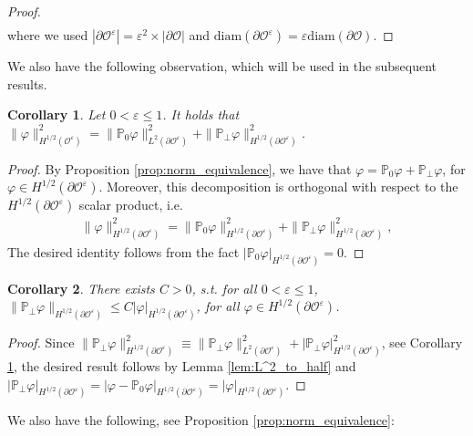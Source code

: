 \documentclass[]{article}
\newtheorem{corollary}{Corollary}
\numberwithin{equation}{section}
\numberwithin{theorem}{section}
\numberwithin{lemma}{section}
\numberwithin{corollary}{section}
\numberwithin{proposition}{section}
\numberwithin{definition}{section}
\newcommand{\re}{\varepsilon}
\renewcommand{\O}{\mathcal{O}}
\newcommand{\bO}{\partial\O}
\begin{document}
\begin{appendices}
\begin{proof}
\begin{align*}
			\end{align*}
			where we used $|\partial\mathcal{O}^{\re}| = \re^2 \times |\partial\mathcal{O}|$ and $\text{diam}(\partial \mathcal{O}^{\re}) = \re  \text{diam}(\partial \mathcal{O})$.
		\end{proof}
		We also have the following observation, which will be used in the subsequent results.
		\begin{corollary}
			\label{corollary:split_norm_H_half}
			Let $0<\re\leq 1$. It holds that  $\|\varphi\|^2_{H^{1/2}(\O^{\re})}=\|\mathbb{P}_0\varphi\|^2_{L^2(\partial\mathcal{O}^{\re})}+\|\mathbb{P}_{\perp}\varphi\|^2_{H^{1/2}(\partial\mathcal{O}^{\re})}$. 
		\end{corollary}
		\begin{proof}
			By Proposition \ref{prop:norm_equivalence}, we have that $\varphi=\mathbb{P}_0\varphi+\mathbb{P}_{\perp}\varphi$, for $\varphi \in H^{1/2}(\bO^{\re})$. Moreover, this decomposition is orthogonal with respect to the $H^{1/2}(\partial\mathcal{O}^{\re})$ scalar product, i.e.
			\begin{align*}
				\|\varphi\|^2_{H^{1/2}(\partial\mathcal{O}^{\re})}=\| \mathbb{P}_0\varphi\|^2_{H^{1/2}(\partial\mathcal{O}^{\re})}+\|\mathbb{P}_{\perp}\varphi\|^2_{H^{1/2}(\partial\mathcal{O}^{\re})},
			\end{align*} 
			The desired identity follows from the fact $|\mathbb{P}_0\varphi|_{H^{1/2}(\bO^{\re})} = 0$.
		\end{proof}
		\begin{corollary}
			\label{cor:equiv_norm}
			There exists $C>0$, s.t. for all $0<\re\leq 1$, $\|\mathbb{P}_{\perp}\varphi\|_{H^{1/2}(\partial \mathcal{O}^{\re})}\leq C|\varphi|_{H^{1/2}(\partial \mathcal{O}^{\re})}$, for all $\varphi\in H^{1/2}(\partial\mathcal{O}^{\re})$. 
		\end{corollary}
		\begin{proof}
			Since $
			\|\mathbb{P}_{\perp} \varphi \|^2_{H^{1/2}(\partial \O^{\re})}  \equiv\|\mathbb{P}_{\perp}\varphi\|^2_{L^2(\partial \O^{\re})}+|\mathbb{P}_{\perp}\varphi|^2_{H^{1/2}(\partial \O^{\re})}$, see Corollary \ref{corollary:split_norm_H_half},
			the desired result follows by Lemma \ref{lem:L^2_to_half} and $|\mathbb{P}_{\perp}\varphi|_{H^{1/2}(\partial \O^{\re})}=|\varphi-\mathbb{P}_0\varphi|_{H^{1/2}(\partial \O^{\re})}=|\varphi|_{H^{1/2}(\partial \O^{\re})}$.
		\end{proof}
		We also have the following, see Proposition \ref{prop:norm_equivalence}: 
		\begin{align}

\end{align}
\end{appendices}
\end{document}
